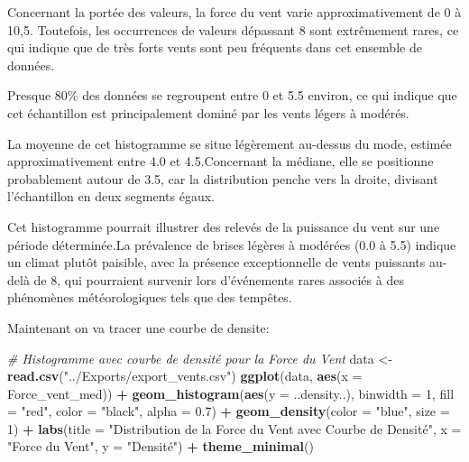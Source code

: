 \documentclass[
]{article}
\newenvironment{Shaded}{\begin{snugshade}}{\end{snugshade}}
\newcommand{\AttributeTok}[1]{\textcolor[rgb]{0.13,0.29,0.53}{#1}}
\newcommand{\CommentTok}[1]{\textcolor[rgb]{0.56,0.35,0.01}{\textit{#1}}}
\newcommand{\DecValTok}[1]{\textcolor[rgb]{0.00,0.00,0.81}{#1}}
\newcommand{\FloatTok}[1]{\textcolor[rgb]{0.00,0.00,0.81}{#1}}
\newcommand{\FunctionTok}[1]{\textcolor[rgb]{0.13,0.29,0.53}{\textbf{#1}}}
\newcommand{\NormalTok}[1]{#1}
\newcommand{\OtherTok}[1]{\textcolor[rgb]{0.56,0.35,0.01}{#1}}
\newcommand{\SpecialCharTok}[1]{\textcolor[rgb]{0.81,0.36,0.00}{\textbf{#1}}}
\newcommand{\StringTok}[1]{\textcolor[rgb]{0.31,0.60,0.02}{#1}}
\begin{document}
Concernant la portée des valeurs, la force du vent varie
approximativement de 0 à 10,5. Toutefois, les occurrences de valeurs
dépassant 8 sont extrêmement rares, ce qui indique que de très forts
vents sont peu fréquents dans cet ensemble de données.

Presque 80\% des données se regroupent entre 0 et 5.5 environ, ce qui
indique que cet échantillon est principalement dominé par les vents
légers à modérés.

La moyenne de cet histogramme se situe légèrement au-dessus du mode,
estimée approximativement entre 4.0 et 4.5.Concernant la médiane, elle
se positionne probablement autour de 3.5, car la distribution penche
vers la droite, divisant l'échantillon en deux segments égaux.

Cet histogramme pourrait illustrer des relevés de la puissance du vent
sur une période déterminée.La prévalence de brises légères à modérées
(0.0 à 5.5) indique un climat plutôt paisible, avec la présence
exceptionnelle de vents puissants au-delà de 8, qui pourraient survenir
lors d'événements rares associés à des phénomènes météorologiques tels
que des tempêtes.

Maintenant on va tracer une courbe de densite:

\begin{Shaded}
\begin{Highlighting}[]
\CommentTok{\# Histogramme avec courbe de densité pour la Force du Vent}
\NormalTok{data }\OtherTok{\textless{}{-}} \FunctionTok{read.csv}\NormalTok{(}\StringTok{"../Exports/export\_vents.csv"}\NormalTok{)}
\FunctionTok{ggplot}\NormalTok{(data, }\FunctionTok{aes}\NormalTok{(}\AttributeTok{x =}\NormalTok{ Force\_vent\_med)) }\SpecialCharTok{+}
  \FunctionTok{geom\_histogram}\NormalTok{(}\FunctionTok{aes}\NormalTok{(}\AttributeTok{y =}\NormalTok{ ..density..), }\AttributeTok{binwidth =} \DecValTok{1}\NormalTok{, }\AttributeTok{fill =} \StringTok{"red"}\NormalTok{, }\AttributeTok{color =} \StringTok{"black"}\NormalTok{, }\AttributeTok{alpha =} \FloatTok{0.7}\NormalTok{) }\SpecialCharTok{+}
  \FunctionTok{geom\_density}\NormalTok{(}\AttributeTok{color =} \StringTok{"blue"}\NormalTok{, }\AttributeTok{size =} \DecValTok{1}\NormalTok{) }\SpecialCharTok{+} 
  \FunctionTok{labs}\NormalTok{(}\AttributeTok{title =} \StringTok{"Distribution de la Force du Vent avec Courbe de Densité"}\NormalTok{, }\AttributeTok{x =} \StringTok{"Force du Vent"}\NormalTok{, }\AttributeTok{y =} \StringTok{"Densité"}\NormalTok{) }\SpecialCharTok{+}
  \FunctionTok{theme\_minimal}\NormalTok{()}
\end{Highlighting}
\end{Shaded}
\end{document}
